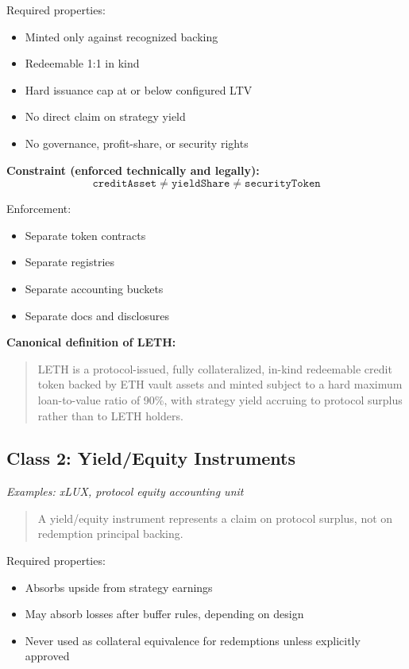 \documentclass[11pt,a4paper]{article}
\begin{document}
Required properties:
\begin{itemize}[leftmargin=2em]
\item Minted only against recognized backing
\item Redeemable 1:1 in kind
\item Hard issuance cap at or below configured LTV
\item No direct claim on strategy yield
\item No governance, profit-share, or security rights
\end{itemize}

\textbf{Constraint (enforced technically and legally):}
$$\texttt{creditAsset} \neq \texttt{yieldShare} \neq \texttt{securityToken}$$

Enforcement:
\begin{itemize}[leftmargin=2em]
\item Separate token contracts
\item Separate registries
\item Separate accounting buckets
\item Separate docs and disclosures
\end{itemize}

\textbf{Canonical definition of LETH:}

\begin{quote}
LETH is a protocol-issued, fully collateralized, in-kind redeemable credit token backed by ETH vault assets and minted subject to a hard maximum loan-to-value ratio of 90\%, with strategy yield accruing to protocol surplus rather than to LETH holders.
\end{quote}

\subsection{Class 2: Yield/Equity Instruments}

\textit{Examples: xLUX, protocol equity accounting unit}

\begin{quote}
A yield/equity instrument represents a claim on protocol surplus, not on redemption principal backing.
\end{quote}

Required properties:
\begin{itemize}[leftmargin=2em]
\item Absorbs upside from strategy earnings
\item May absorb losses after buffer rules, depending on design
\item Never used as collateral equivalence for redemptions unless explicitly approved
\end{itemize}
\end{document}
